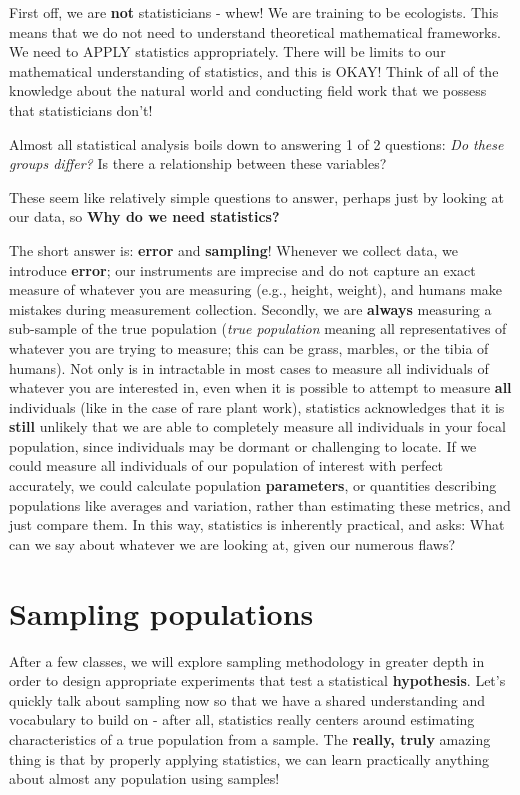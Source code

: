 \documentclass[
]{book}
\begin{document}
First off, we are \textbf{not} statisticians - whew! We are training to be ecologists. This means that we do not need to understand theoretical mathematical frameworks. We need to APPLY statistics appropriately. There will be limits to our mathematical understanding of statistics, and this is OKAY! Think of all of the knowledge about the natural world and conducting field work that we possess that statisticians don't!

Almost all statistical analysis boils down to answering 1 of 2 questions:
\emph{Do these groups differ?
}Is there a relationship between these variables?

These seem like relatively simple questions to answer, perhaps just by looking at our data, so \textbf{Why do we need statistics?}

The short answer is: \textbf{error} and \textbf{sampling}! Whenever we collect data, we introduce \textbf{error}; our instruments are imprecise and do not capture an exact measure of whatever you are measuring (e.g., height, weight), and humans make mistakes during measurement collection. Secondly, we are \textbf{always} measuring a sub-sample of the true population (\emph{true population} meaning all representatives of whatever you are trying to measure; this can be grass, marbles, or the tibia of humans). Not only is in intractable in most cases to measure all individuals of whatever you are interested in, even when it is possible to attempt to measure \textbf{all} individuals (like in the case of rare plant work), statistics acknowledges that it is \textbf{still} unlikely that we are able to completely measure all individuals in your focal population, since individuals may be dormant or challenging to locate. If we could measure all individuals of our population of interest with perfect accurately, we could calculate population \textbf{parameters}, or quantities describing populations like averages and variation, rather than estimating these metrics, and just compare them. In this way, statistics is inherently practical, and asks: What can we say about whatever we are looking at, given our numerous flaws?

\hypertarget{sampling-populations}{%
\section{Sampling populations}\label{sampling-populations}}

After a few classes, we will explore sampling methodology in greater depth in order to design appropriate experiments that test a statistical \textbf{hypothesis}. Let's quickly talk about sampling now so that we have a shared understanding and vocabulary to build on - after all, statistics really centers around estimating characteristics of a true population from a sample. The \textbf{really, truly} amazing thing is that by properly applying statistics, we can learn practically anything about almost any population using samples!
\end{document}
